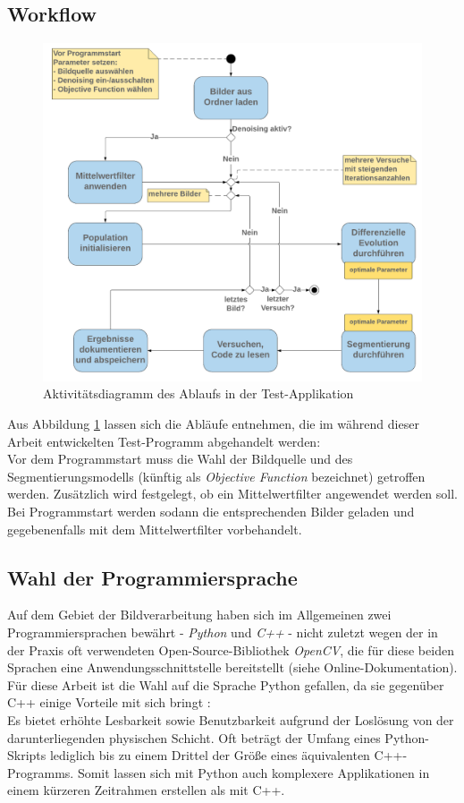 		\subsection{Workflow}
		\label{sub:workflow}
			\begin{figure}[H]
				\centering
				\includegraphics[width=0.9\linewidth]{diff-evol-activity}
				\caption{Aktivitätsdiagramm des Ablaufs in der Test-Applikation}
				\label{fig:diff-evol-activity}
			\end{figure}
			Aus Abbildung \ref{fig:diff-evol-activity} lassen sich die Abläufe entnehmen, die im während dieser Arbeit entwickelten Test-Programm abgehandelt werden:\\
			Vor dem Programmstart muss die Wahl der Bildquelle und des Segmentierungsmodells (künftig als \textit{Objective Function} bezeichnet) getroffen werden. Zusätzlich wird festgelegt, ob ein Mittelwertfilter angewendet werden soll. \\
			Bei Programmstart werden sodann die entsprechenden Bilder geladen und gegebenenfalls mit dem Mittelwertfilter vorbehandelt. 
	
		\subsection{Wahl der Programmiersprache}
		\label{sub:prog-lang}
			Auf dem Gebiet der Bildverarbeitung haben sich im Allgemeinen zwei Programmiersprachen bewährt - \textit{Python} und \textit{C++} - nicht zuletzt wegen der in der Praxis oft verwendeten Open-Source-Bibliothek \textit{OpenCV}, die für diese beiden Sprachen eine Anwendungsschnittstelle bereitstellt (siehe Online-Dokumentation). Für diese Arbeit ist die Wahl auf die Sprache Python gefallen, da sie gegenüber C++ einige Vorteile mit sich bringt \cite[S. 21f]{python-book}:\\
			Es bietet erhöhte Lesbarkeit sowie Benutzbarkeit aufgrund der Loslösung von der darunterliegenden physischen Schicht. Oft beträgt der Umfang eines Python-Skripts lediglich bis zu einem Drittel der Größe eines äquivalenten C++-Programms. Somit lassen sich mit Python auch komplexere Applikationen in einem kürzeren Zeitrahmen erstellen als mit C++.

